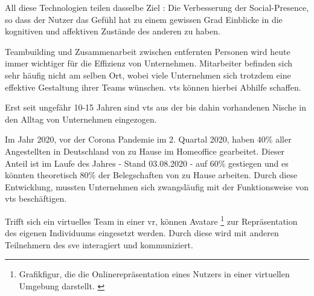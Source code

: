 \documentclass[a4paper,11pt]{article}%
\renewcommand{\\}{\vspace*{0.5\baselineskip} \newline}
\begin{document}
All diese Technologien teilen dasselbe Ziel : \\ \dq{}Die Verbesserung der \dq{}Social-Presence\dq{}, so dass der Nutzer das Gefühl hat zu einem gewissen Grad Einblicke in die kognitiven und affektiven Zustände des anderen zu haben.\dq{} \citep{biocca2002defining} \citep[p.407–447]{biocca2001plugging}

Teambuilding und Zusammenarbeit zwischen entfernten Personen wird heute immer wichtiger für die Effizienz von Unternehmen. Mitarbeiter befinden sich sehr häufig nicht am selben Ort, wobei viele Unternehmen sich trotzdem eine effektive Gestaltung ihrer Teams wünschen. \citep[p.791-792]{jarvenpaa1999communication} \ac{vts} können hierbei Abhilfe schaffen. 
	
Erst seit ungefähr 10-15 Jahren sind \ac{vts} aus der bis dahin vorhandenen Nische in den Alltag von Unternehmen eingezogen. \citep{gilson2015virtual}

Im Jahr 2020, vor der Corona Pandemie im 2. Quartal 2020, haben 40\% aller Angestellten in Deutschland von zu Hause im \dq{}Homeoffice\dq{} gearbeitet. Dieser Anteil ist im Laufe des Jahres - Stand 03.08.2020 - auf 60\% gestiegen und es könnten theoretisch 80\% der Belegschaften von zu Hause arbeiten. \citep{statistaCorona2020} Durch diese Entwicklung, mussten Unternehmen sich zwangsläufig mit der Funktionsweise von \ac{vts} beschäftigen.

Trifft sich ein virtuelles Team in einer \ac{vr}, können Avatare \footnote{Grafikfigur, die die Onlinerepräsentation eines Nutzers in einer virtuellen Umgebung darstellt. \citep[p.1]{neustaedter2009presenting}} zur Repräsentation des eigenen Individuums eingesetzt werden. Durch diese wird mit anderen Teilnehmern des \ac{sve} interagiert und kommuniziert.

\newpage
\end{document}

